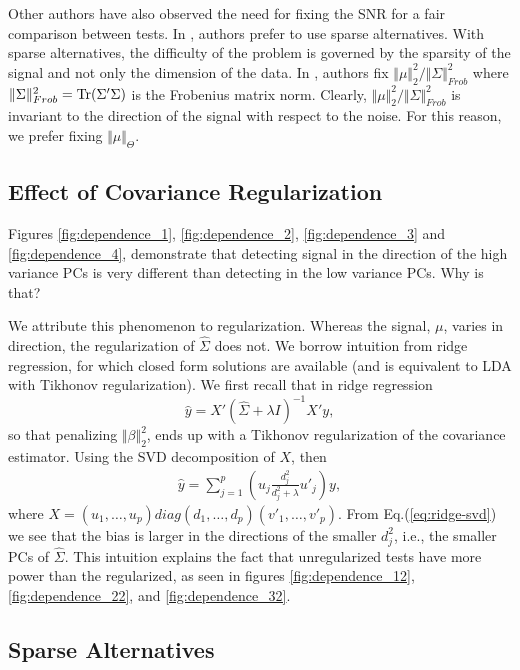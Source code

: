 \documentclass[]{bio}
\begin{document}
Other authors have also observed the need for fixing the SNR for a fair comparison between tests.
In \cite{ramdas2015decreasing}, authors prefer to use sparse alternatives.
With sparse alternatives, the difficulty of the problem is governed by the sparsity of the signal and not only the dimension of the data. 
In \cite{chen2010two}, authors fix $\Vert \mu \Vert_2^2/\Vert \Sigma \Vert^2_{Frob}$ where $\Vert \Sigma \Vert^2_{Frob}=\operatorname{Tr}(\Sigma'\Sigma)$ is the Frobenius matrix norm. 
Clearly, $\Vert \mu \Vert_2^2/\Vert \Sigma \Vert^2_{Frob}$ is invariant to the direction of the signal with respect to the noise. 
For this reason, we prefer fixing $\Vert \mu \Vert_\Theta$.






\subsection{Effect of Covariance Regularization}
Figures \ref{fig:dependence_1}, \ref{fig:dependence_2}, \ref{fig:dependence_3} and \ref{fig:dependence_4}, demonstrate that detecting signal in the direction of the high variance PCs is very different than detecting in the low variance PCs.
Why is that?

We attribute this phenomenon to regularization.
Whereas the signal, $\mu$, varies in direction, the regularization of $\hat \Sigma$ does not. 
We borrow intuition from ridge regression, for which closed form solutions are available (and is equivalent to LDA with Tikhonov regularization). 
We first recall that in ridge regression 
$$\hat y = X'(\hat \Sigma +\lambda I)^{-1}X'y,$$
so that penalizing $\Vert \beta \Vert_2^2$, ends up with a Tikhonov regularization of the covariance estimator.
Using the SVD decomposition of $X$, then 
\begin{align}
\label{eq:ridge-svd}
\hat y= \sum_{j=1}^p \left( u_j \frac{d_j^2}{d_j^2+\lambda}u'_j \right)y,
\end{align}
where
$X=(u_1,\dots,u_p)diag(d_1,\dots,d_p)(v'_1,\dots,v'_p)$.
From Eq.(\ref{eq:ridge-svd}) we see that the bias is larger in the directions of the smaller $d_j^2$, i.e., the smaller PCs of $\hat \Sigma$. 
This intuition explains the fact that unregularized tests have more power than the regularized, as seen in figures \ref{fig:dependence_12}, \ref{fig:dependence_22}, and \ref{fig:dependence_32}.


\subsection{Sparse Alternatives}
\label{sec:sparse}
\end{document}
